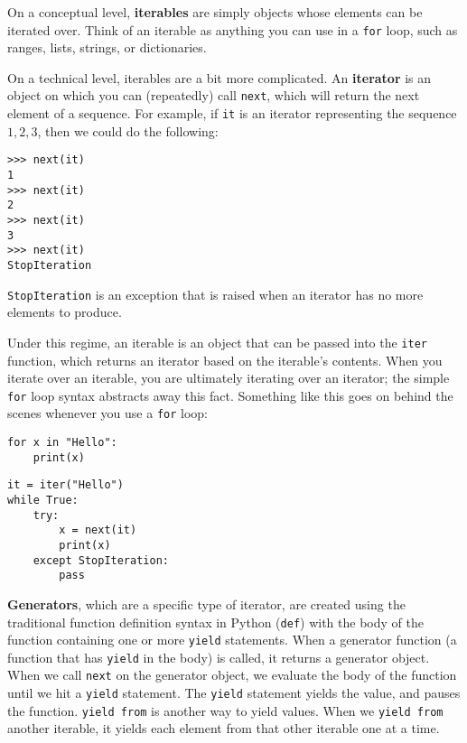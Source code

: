 On a conceptual level, \textbf{iterables} are simply objects whose elements can be iterated over. Think of an iterable as anything you can use in a \lstinline{for} loop, such as ranges, lists, strings, or dictionaries.

On a technical level, iterables are a bit more complicated. An \textbf{iterator} is an object on which you can (repeatedly) call \lstinline{next}, which will return the next element of a sequence. For example, if \lstinline{it} is an iterator representing the sequence $1, 2, 3$, then we could do the following: 
\begin{lstlisting}
>>> next(it)
1
>>> next(it)
2
>>> next(it)
3
>>> next(it)
StopIteration
\end{lstlisting}

\lstinline{StopIteration} is an exception that is raised when an iterator has no more elements to produce. 

Under this regime, an iterable is an object that can be passed into the \lstinline{iter} function, which returns an iterator based on the iterable's contents. When you iterate over an iterable, you are ultimately iterating over an iterator; the simple \lstinline{for} loop syntax abstracts away this fact. Something like this goes on behind the scenes whenever you use a \lstinline{for} loop:

\begin{center}
\begin{minipage}[t]{0.4\textwidth}
\begin{lstlisting}
for x in "Hello":
    print(x)
\end{lstlisting}
\end{minipage}
\begin{minipage}[t]{0.4\textwidth}
\begin{lstlisting}
it = iter("Hello")
while True:
    try: 
        x = next(it)
        print(x)
    except StopIteration:
        pass
\end{lstlisting}
\end{minipage}
\end{center}

\textbf{Generators}, which are a specific type of iterator, are created using the traditional function definition syntax in Python (\lstinline{def}) with the body of the function containing one or more \lstinline{yield} statements. When a generator function (a function that has \lstinline{yield} in the body) is called, it returns a generator object. When we call \lstinline{next} on the generator object, we evaluate the body of the function until we hit a \lstinline{yield} statement. The \lstinline{yield} statement yields the value, and pauses the function. \lstinline{yield from} is another way to yield values. When we \lstinline{yield from} another iterable, it yields each element from that other iterable one at a time. 

